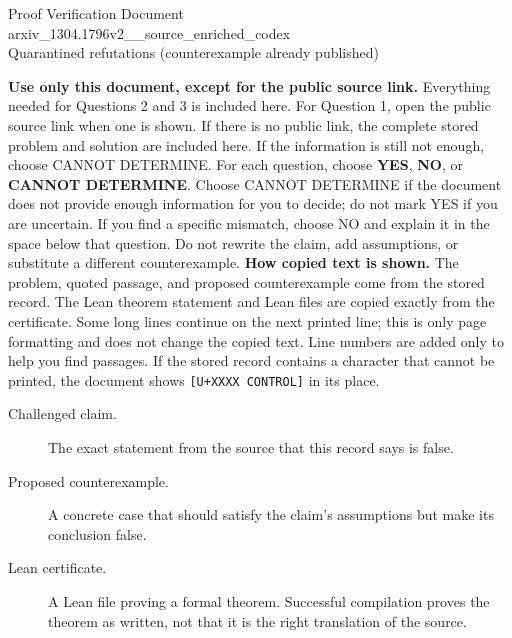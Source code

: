 \documentclass[11pt]{article}
\begin{document}
\begin{center}{\LARGE Proof Verification Document}\\[2pt]{\large arxiv\_1304.1796v2\_\_source\_enriched\_codex}\\[2pt]{\small Quarantined refutations (counterexample already published)}\end{center}
\begin{center}\end{center}
\textbf{Use only this document, except for the public source link.} Everything needed for Questions 2 and 3 is included here. For Question 1, open the public source link when one is shown. If there is no public link, the complete stored problem and solution are included here. If the information is still not enough, choose CANNOT DETERMINE.
For each question, choose \textbf{YES}, \textbf{NO}, or \textbf{CANNOT DETERMINE}. Choose CANNOT DETERMINE if the document does not provide enough information for you to decide; do not mark YES if you are uncertain. If you find a specific mismatch, choose NO and explain it in the space below that question. Do not rewrite the claim, add assumptions, or substitute a different counterexample.
\textbf{How copied text is shown.} The problem, quoted passage, and proposed counterexample come from the stored record. The Lean theorem statement and Lean files are copied exactly from the certificate. Some long lines continue on the next printed line; this is only page formatting and does not change the copied text. Line numbers are added only to help you find passages. If the stored record contains a character that cannot be printed, the document shows \texttt{[U+XXXX CONTROL]} in its place.
\begin{description}
\item[Challenged claim.] The exact statement from the source that this record says is false.
\item[Proposed counterexample.] A concrete case that should satisfy the claim's assumptions but make its conclusion false.
\item[Lean certificate.] A Lean file proving a formal theorem. Successful compilation proves the theorem as written, not that it is the right translation of the source.
\end{description}
\end{document}
